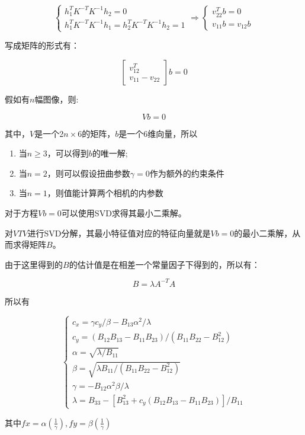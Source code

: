\documentclass{lzureport}
\begin{document}
$$
\left.\left\{\begin{array}{l}h_1^TK^{-T}K^{-1}h_2=0\\h_1^TK^{-T}K^{-1}h_1=h_2^TK^{-T}K^{-1}h_2=1\end{array}\right.\right.\Rightarrow\left\{\begin{array}{l}v_{22}^Tb=0\\v_{11}b=v_{12}b\end{array}\right.
$$

写成矩阵的形式有：

$$
\left.\left[\begin{matrix}v_{12}^T\\v_{11}-v_{22}\end{matrix}\right.\right]b=0
$$

假如有$n$幅图像，则:

$$
Vb=0
$$

其中，$V$是一个2$n\times 6$的矩阵，$b$是一个6维向量，所以

\begin{enumerate}[label=\arabic*)]
	\item 当$n\ge 3$，可以得到$b$的唯一解;
	\item 当$n=2$，则可以假设扭曲参数$\gamma=0$作为额外的约束条件
	\item 当$n=1$，则值能计算两个相机的内参数
\end{enumerate}	


对于方程$Vb=0$可以使用SVD求得其最小二乘解。

对$VTV$进行SVD分解，其最小特征值对应的特征向量就是$Vb=0$的最小二乘解，从而求得矩阵$B$。

由于这里得到的$B$的估计值是在相差一个常量因子下得到的，所以有：

$$
B=\lambda A^{-T}A
$$

所以有

$$
\begin{cases}
	c_x=\gamma c_y/\beta-B_{13}\alpha^2/\lambda\\
	c_y=(B_{12}B_{13}-B_{11}B_{23})/(B_{11}B_{22}-B_{12}^2)\\
	\alpha=\sqrt{\lambda/B_{11}}\\
	\beta=\sqrt{\lambda B_{11}/(B_{11}B_{22}-B_{12}^2)}\\
	\gamma=-B_{12}\alpha^2\beta/\lambda\\
	\lambda=B_{33}-[B_{13}^2+c_y(B_{12}B_{13}-B_{11}B_{23})]/B_{11}
\end{cases}
$$

其中$fx =\alpha(\frac{1}{\gamma}),fy = \beta(\frac{1}{\gamma})$
\end{document}
